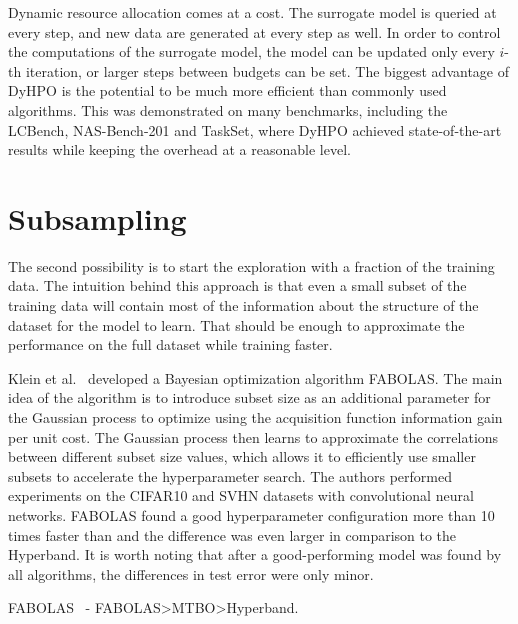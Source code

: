 Dynamic resource allocation comes at a cost. The surrogate model is queried at every step, and new data are generated at every step as well. In order to control the computations of the surrogate model, the model can be updated only every $i$-th iteration, or larger steps between budgets can be set. The biggest advantage of DyHPO is the potential to be much more efficient than commonly used algorithms. This was demonstrated on many benchmarks, including the LCBench, NAS-Bench-201 and TaskSet, where DyHPO achieved state-of-the-art results while keeping the overhead at a reasonable level.



\section{Subsampling}
The second possibility is to start the exploration with a fraction of the training data. The intuition behind this approach is that even a small subset of the training data will contain most of the information about the structure of the dataset for the model to learn. That should be enough to approximate the performance on the full dataset while training faster.

Klein et al.~\cite{klein2017fast} developed a Bayesian optimization algorithm FABOLAS. The main idea of the algorithm is to introduce subset size as an additional parameter for the Gaussian process to optimize using the acquisition function information gain per unit cost. The Gaussian process then learns to approximate the correlations between different subset size values, which allows it to efficiently use smaller subsets to accelerate the hyperparameter search. The authors performed experiments on the CIFAR10 and SVHN datasets with convolutional neural networks. FABOLAS found a good hyperparameter configuration more than 10 times faster than  and the difference was even larger in comparison to the Hyperband. It is worth noting that after a good-performing model was found by all algorithms, the differences in test error were only minor.

FABOLAS~\cite{klein2017fast} - FABOLAS>MTBO>Hyperband.

